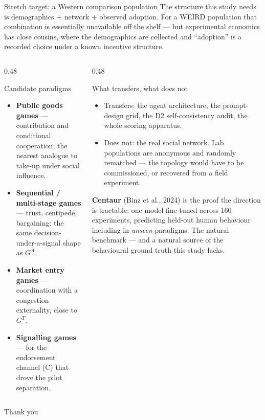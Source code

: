 \documentclass[aspectratio=169,10pt]{beamer}
\newcommand{\hl}[1]{\textcolor{mLightBrown}{#1}}
\begin{document}
\begin{frame}{Stretch target: a Western comparison population}
  \scriptsize
  The structure this study needs is \hl{demographics $+$ network $+$ observed
  adoption}. For a WEIRD population that combination is essentially unavailable
  off the shelf --- but experimental economics has close cousins, where the
  demographics are collected and ``adoption'' is a recorded choice under a known
  incentive structure.
  \smallskip

  \begin{columns}[T,onlytextwidth]
    \begin{column}{0.48\textwidth}
      \begin{block}{Candidate paradigms}
        \scriptsize
        \begin{itemize}\scriptsize
          \item \textbf{Public goods games} --- contribution and conditional
                cooperation; the nearest analogue to take-up under social
                influence.
          \item \textbf{Sequential / multi-stage games} --- trust, centipede,
                bargaining: the same decision-under-a-signal shape as $G^A$.
          \item \textbf{Market entry games} --- coordination with a congestion
                externality, close to $G^T$.
          \item \textbf{Signalling games} --- for the endorsement channel (C)
                that drove the pilot separation.
        \end{itemize}
      \end{block}
    \end{column}
    \begin{column}{0.48\textwidth}
      \begin{block}{What transfers, what does not}
        \scriptsize
        \begin{itemize}\scriptsize
          \item \hl{Transfers:} the agent architecture, the prompt-design grid,
                the D2 self-consistency audit, the whole scoring apparatus.
          \item \hl{Does not:} the real social network. Lab populations are
                anonymous and randomly rematched --- the topology would have to
                be commissioned, or recovered from a field experiment.
        \end{itemize}
      \end{block}
      \scriptsize
      \textbf{Centaur} (Binz et al., 2024) is the proof the direction is
      tractable: one model fine-tuned across 160 experiments, predicting held-out
      human behaviour including in \emph{unseen} paradigms. The natural benchmark
      --- and a natural source of the behavioural ground truth this study lacks.
    \end{column}
  \end{columns}
\end{frame}

\begin{frame}[standout]
  Thank you
\end{frame}
\end{document}
